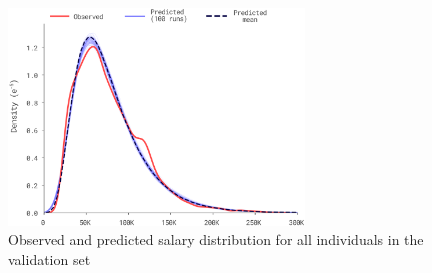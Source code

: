 \begin{figure}[H]
    \centering
    \includegraphics[width=0.7\textwidth]{images/ch5_agg_level/salary.png}
    \caption{Observed and predicted salary distribution for all individuals in the validation set}
    \setlength{\abovecaptionskip}{-10pt}
    \label{fig:validation_avg}
\end{figure}

